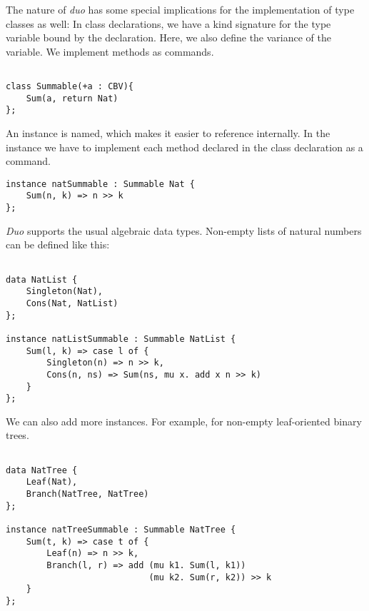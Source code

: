 The nature of \emph{duo} has some special implications for the implementation of type classes as well:
In class declarations, we have a kind signature for the type variable bound by the declaration.
Here, we also define the variance of the variable.
We implement methods as commands.

\begin{lstlisting}[style=duostyle, label=code:duo-class-decl, captionpos=b, caption={Type class declaration  in \emph{duo}}]

class Summable(+a : CBV){
    Sum(a, return Nat)
};

\end{lstlisting}

An instance is named, which makes it easier to reference internally.
In the instance we have to implement each method declared in the class declaration as a command.

\begin{lstlisting}[style=duostyle, label=code:duo-nat-list, captionpos=b, caption={Instance declaration for natural numbers in \emph{duo}}]
instance natSummable : Summable Nat {
    Sum(n, k) => n >> k
};
\end{lstlisting}

\emph{Duo} supports the usual algebraic data types. Non-empty lists of natural numbers can be defined like this:

\begin{lstlisting}[style=duostyle, label=code:duo-nat-list-two, captionpos=b, caption={Data and instance declaration for non-empty lists of in \emph{duo}}]

data NatList {
    Singleton(Nat),
    Cons(Nat, NatList)
};

instance natListSummable : Summable NatList {
    Sum(l, k) => case l of {
        Singleton(n) => n >> k,
        Cons(n, ns) => Sum(ns, mu x. add x n >> k)
    }
};

\end{lstlisting}

We can also add more instances. For example, for non-empty leaf-oriented binary trees.

\begin{lstlisting}[style=duostyle, label=code:duo-tree-instance, captionpos=b, caption={Type class example  in \emph{duo}}]

data NatTree {
    Leaf(Nat),
    Branch(NatTree, NatTree)
};

instance natTreeSummable : Summable NatTree {
    Sum(t, k) => case t of {
        Leaf(n) => n >> k,
        Branch(l, r) => add (mu k1. Sum(l, k1))
                            (mu k2. Sum(r, k2)) >> k
    }
};

\end{lstlisting}

